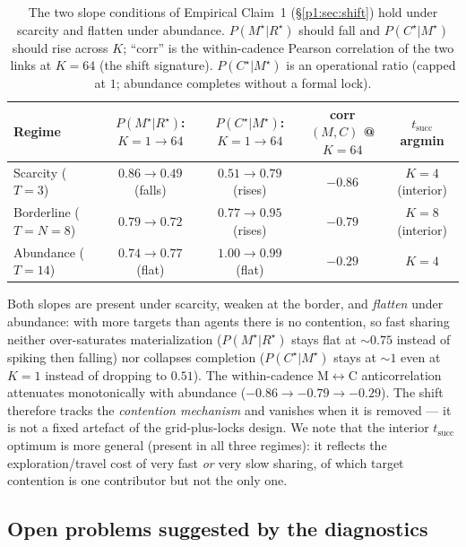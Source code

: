 \documentclass{article}
\begin{document}
\begin{table}[h]
\caption{The two slope conditions of Empirical Claim~1 (\S\ref{p1:sec:shift}) hold under scarcity and flatten under abundance. $P(M^\star|R^\star)$ should fall and $P(C^\star|M^\star)$ should rise across $K$; ``corr'' is the within-cadence Pearson correlation of the two links at $K{=}64$ (the shift signature). $P(C^\star|M^\star)$ is an operational ratio (capped at $1$; abundance completes without a formal lock).}
\label{p1:tab:cadence-robustness}
\centering
\small
\begin{tabular}{l c c c c}
\toprule
Regime & $P(M^\star|R^\star)$: $K{=}1\!\to\!64$ & $P(C^\star|M^\star)$: $K{=}1\!\to\!64$ & corr$(M,C)$ @ $K{=}64$ & $t_{\mathrm{succ}}$ argmin \\
\midrule
Scarcity ($T{=}3$)      & $0.86 \to 0.49$ (falls) & $0.51 \to 0.79$ (rises) & $-0.86$ & $K{=}4$ (interior) \\
Borderline ($T{=}N{=}8$) & $0.79 \to 0.72$        & $0.77 \to 0.95$ (rises) & $-0.79$ & $K{=}8$ (interior) \\
Abundance ($T{=}14$)    & $0.74 \to 0.77$ (flat)  & $1.00 \to 0.99$ (flat)  & $-0.29$ & $K{=}4$ \\
\bottomrule
\end{tabular}
\end{table}

Both slopes are present under scarcity, weaken at the border, and \emph{flatten}
under abundance: with more targets than agents there is no contention, so fast
sharing neither over-saturates materialization ($P(M^\star|R^\star)$ stays flat
at $\sim0.75$ instead of spiking then falling) nor collapses completion
($P(C^\star|M^\star)$ stays at $\sim1$ even at $K{=}1$ instead of dropping to
$0.51$). The within-cadence M$\leftrightarrow$C anticorrelation attenuates
monotonically with abundance ($-0.86\to-0.79\to-0.29$). The shift therefore
tracks the \emph{contention mechanism} and vanishes when it is removed --- it is
not a fixed artefact of the grid-plus-locks design. We note that the
interior $t_{\mathrm{succ}}$ optimum is more general (present in all three
regimes): it reflects the exploration/travel cost of very fast \emph{or} very
slow sharing, of which target contention is one contributor but not the only
one.

\subsection{Open problems suggested by the diagnostics}
\label{p1:app:open-problems}
\end{document}
